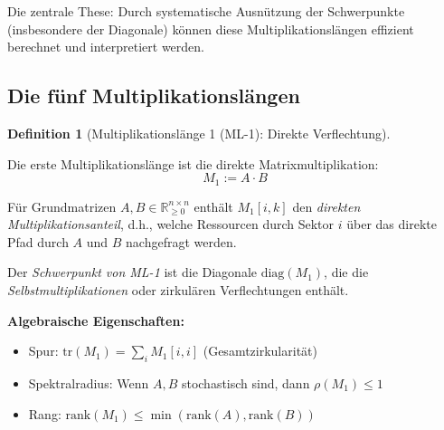 \documentclass[a4paper,12pt]{article}
\theoremstyle{definition}
\newtheorem{definition}{Definition}
\begin{document}
Die zentrale These: Durch systematische Ausnützung der Schwerpunkte (insbesondere der Diagonale) können diese Multiplikationslängen effizient berechnet und interpretiert werden.

\subsection{Die fünf Multiplikationslängen}

\begin{definition}[Multiplikationslänge 1 (ML-1): Direkte Verflechtung]
\label{def:ml1}

Die erste Multiplikationslänge ist die direkte Matrixmultiplikation:
\[
M_1 := A \cdot B
\]

Für Grundmatrizen $A, B \in \mathbb{R}^{n \times n}_{\geq 0}$ enthält $M_1[i,k]$ den \emph{direkten Multiplikationsanteil}, d.h., welche Ressourcen durch Sektor $i$ über das direkte Pfad durch $A$ und $B$ nachgefragt werden.

Der \emph{Schwerpunkt von ML-1} ist die Diagonale $\text{diag}(M_1)$, die die \emph{Selbstmultiplikationen} oder zirkulären Verflechtungen enthält.

\textbf{Algebraische Eigenschaften:}
\begin{itemize}
\item Spur: $\mathrm{tr}(M_1) = \sum_i M_1[i,i]$ (Gesamtzirkularität)
\item Spektralradius: Wenn $A, B$ stochastisch sind, dann $\rho(M_1) \leq 1$
\item Rang: $\mathrm{rank}(M_1) \leq \min(\mathrm{rank}(A), \mathrm{rank}(B))$
\end{itemize}
\end{definition}
\end{document}
